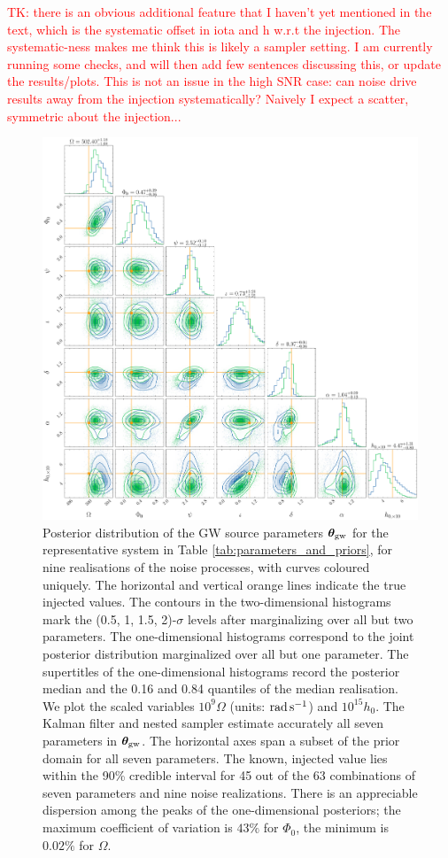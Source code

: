 \documentclass[fleqn,usenatbib,useAMS]{mnras}
\begin{document}
 \textcolor{red}{TK: there is an obvious additional feature that I haven't yet mentioned in the text, which is the systematic offset in iota and h w.r.t the injection. The systematic-ness makes me think this is likely a sampler setting. I am currently running some checks, and will then add few sentences discussing this, or update the results/plots. This is not an issue in the high SNR case: can noise drive results away from the injection systematically? Naively I expect a scatter, symmetric about the injection... }
  

\begin{figure}
	\includegraphics[width=\textwidth, height =\textwidth ]{images/corner_lowSNR}
	\caption{Posterior distribution of the GW source parameters $\boldsymbol{\theta}_{\rm gw}$ for the representative system in Table \ref{tab:parameters_and_priors}, for nine realisations of the noise processes, with curves coloured uniquely. The horizontal and vertical orange lines indicate the true injected values. The contours in the two-dimensional histograms mark the (0.5, 1, 1.5, 2)-$\sigma$ levels after marginalizing over all but two parameters. The one-dimensional histograms correspond to the joint posterior distribution marginalized over all but one parameter. The supertitles of the one-dimensional histograms record the posterior median and the 0.16 and 0.84 quantiles of the median realisation. We plot the scaled variables $10^9 \Omega$ (units: ${\rm rad \, s^{-1}}$) and $10^{15} h_0$. The Kalman filter and nested sampler estimate accurately all seven parameters in ${\boldsymbol{\theta}}_{\rm gw}$. The horizontal axes span a subset of the prior domain for all seven parameters. The known, injected value lies within the 90\% credible interval for 45 out of the 63 combinations of seven parameters and nine noise realizations. There is an appreciable dispersion among the peaks of the one-dimensional posteriors; the maximum coefficient of variation is $43 \%$ for $\Phi_0$, the minimum is $0.02 \%$ for $\Omega$.}
	\label{fig:corner_plot_1}
\end{figure}
\end{document}
